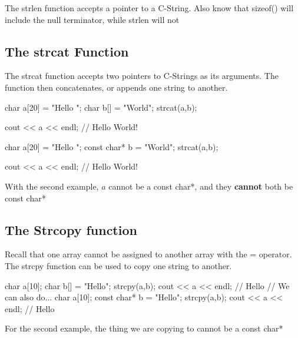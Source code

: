 \documentclass{report}
\begin{document}
    \bigbreak \noindent 
    \begin{notebox}
			The strlen function accepts a pointer to a C-String. Also know that sizeof() will include the null terminator, while strlen will not
		\end{notebox}


    \pagebreak
    \subsection{The strcat Function}
    \bigbreak \noindent 
    The strcat function accepts two pointers to C-Strings as its arguments. The function then concatenates, or appends one string to another.
    \bigbreak \noindent 
    
    \begin{cppcode}
char a[20] = "Hello ";
char b[] = "World";
strcat(a,b);

cout << a << endl; // Hello World!

char a[20] = "Hello ";
const char* b = "World";
strcat(a,b);

cout << a << endl; // Hello World!
    \end{cppcode}
    
    \bigbreak \noindent 
    \begin{notebox}
        With the second example, $a$ cannot be a const char*, and they \textbf{cannot} both be const char*
    \end{notebox}
    
    \bigbreak \noindent 
    \subsection{The Strcopy function}
    \bigbreak \noindent 
    Recall that one array cannot be assigned to another array with the = operator. The strcpy function can be used to copy one string to another.
    \bigbreak \noindent 
    
    \begin{cppcode}
char a[10];
char b[] = "Hello";
strcpy(a,b);
cout << a << endl; // Hello
// We can also do...
char a[10];
const char* b = "Hello";
strcpy(a,b);
cout << a << endl; // Hello
    \end{cppcode}
    
    \bigbreak \noindent 
    \begin{notebox}
			For the second example, the thing we are copying to cannot be a const char*
		\end{notebox}
    \bigbreak \noindent 
\end{document}
